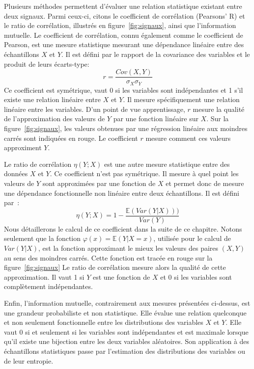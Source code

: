 \documentclass[../main]{subfiles}
\begin{document}
Plusieurs méthodes permettent d'évaluer une relation statistique existant entre deux signaux.
Parmi ceux-ci, citons le coefficient de corrélation (Pearsons' R) et le ratio de corrélation, illustrés en figure~\ref{fig:signaux}, ainsi que l'information mutuelle.
Le coefficient de corrélation, connu également comme le coefficient de Pearson, est une mesure statistique mesurant une dépendance linéaire entre des échantillons $X$ et $Y$. Il est défini par le rapport de la covariance des variables et le produit de leurs écarts-type:
\begin{equation}
    r = \frac{Cov(X,Y)}{\sigma_X \sigma_Y} 
\end{equation}
Ce coefficient est symétrique, vaut 0 si les variables sont indépendantes et 1 s'il existe une relation linéaire entre $X$ et $Y$. Il mesure spécifiquement une relation linéaire entre les variables. 
D'un point de vue apprentissage, $r$ mesure la qualité de l'approximation des valeurs de $Y$ par une fonction linéaire sur $X$. 
Sur la figure~\ref{fig:signaux}, les valeurs obtenues par une régression linéaire aux moindres carrés sont indiquées en rouge. Le coefficient $r$ mesure comment ces valeurs approximent $Y$. 

Le ratio de corrélation $\eta(Y;X)$ est une autre mesure statistique entre des données $X$ et $Y$. Ce coefficient n'est pas symétrique. Il mesure à quel point les valeurs de $Y$ sont approximées par une fonction de $X$ et permet donc de mesure une dépendance fonctionnelle non linéaire entre deux échantillons.
Il est défini par~:
\begin{equation}
    \eta(Y;X) = 1 - \frac{\mathbb{E}(Var(Y|X)))}{Var(Y)}
\end{equation}
Nous détaillerons le calcul de ce coefficient dans la suite de ce chapitre. Notons seulement que la fonction $\varphi(x) = \mathbb{E}(Y|X = x)$, utilisée pour le calcul de $Var(Y|X)$, est la fonction approximant le mieux les valeurs des paires $(X,Y)$ au sens des moindres carrés. Cette fonction est tracée en rouge sur la figure~\ref{fig:signaux}
Le ratio de corrélation mesure alors la qualité de cette approximation. Il vaut 1 si $Y$ est une fonction de $X$ et 0 si les variables sont complètement indépendantes. 

Enfin, l'information mutuelle, contrairement aux mesures présentées ci-dessus, est une grandeur probabiliste et non statistique.
Elle évalue une relation quelconque et non seulement fonctionnelle entre les distributions des variables $X$ et $Y$. Elle vaut 0 si et seulement si les variables sont indépendantes et est maximale lorsque qu'il existe une bijection entre les deux variables aléatoires. Son application à des échantillons statistiques passe par l'estimation des distributions des variables ou de leur entropie.
\end{document}
